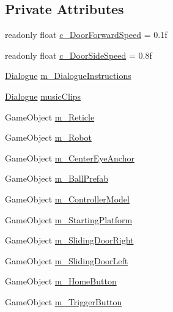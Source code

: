 \subsection*{Private Attributes}
\begin{DoxyCompactItemize}
\item 
readonly float \mbox{\hyperlink{class_intro_session_manager_ae24a9c30326fa7bff220c8a88c97cbbd}{c\+\_\+\+Door\+Forward\+Speed}} = 0.\+1f
\item 
readonly float \mbox{\hyperlink{class_intro_session_manager_a2704a73e12814b6c83f5daec3e962723}{c\+\_\+\+Door\+Side\+Speed}} = 0.\+8f
\item 
\mbox{\hyperlink{class_dialogue}{Dialogue}} \mbox{\hyperlink{class_intro_session_manager_ab695398be29615d5e14df3d1e0019059}{m\+\_\+\+Dialogue\+Instructions}}
\item 
\mbox{\hyperlink{class_dialogue}{Dialogue}} \mbox{\hyperlink{class_intro_session_manager_a470ec4b3778051a627d6c24f40fc61d3}{music\+Clips}}
\item 
Game\+Object \mbox{\hyperlink{class_intro_session_manager_a4acb0cd1ca734c4b2d287c21e0d94f66}{m\+\_\+\+Reticle}}
\item 
Game\+Object \mbox{\hyperlink{class_intro_session_manager_a99b3acd5b53deddb2707d0a572524b2d}{m\+\_\+\+Robot}}
\item 
Game\+Object \mbox{\hyperlink{class_intro_session_manager_a235a181ca063d1fda1e971e7f52d0ebc}{m\+\_\+\+Center\+Eye\+Anchor}}
\item 
Game\+Object \mbox{\hyperlink{class_intro_session_manager_a24b3a594b1749a687454f4f580452d7a}{m\+\_\+\+Ball\+Prefab}}
\item 
Game\+Object \mbox{\hyperlink{class_intro_session_manager_a29cd7383da1ce27357209f218bb4bdb6}{m\+\_\+\+Controller\+Model}}
\item 
Game\+Object \mbox{\hyperlink{class_intro_session_manager_aca0fa30bffd1159e786232541b0f254a}{m\+\_\+\+Starting\+Platform}}
\item 
Game\+Object \mbox{\hyperlink{class_intro_session_manager_a86f65280712498492706c8c460c2ecef}{m\+\_\+\+Sliding\+Door\+Right}}
\item 
Game\+Object \mbox{\hyperlink{class_intro_session_manager_a8f507b5c62504d8f0b3c99583080d1c6}{m\+\_\+\+Sliding\+Door\+Left}}
\item 
Game\+Object \mbox{\hyperlink{class_intro_session_manager_a1ec45e159d4b876b370443534a4140ee}{m\+\_\+\+Home\+Button}}
\item 
Game\+Object \mbox{\hyperlink{class_intro_session_manager_a4ce2d50d7ff83169dc8224b199ac7e68}{m\+\_\+\+Trigger\+Button}}

\end{DoxyCompactItemize}
